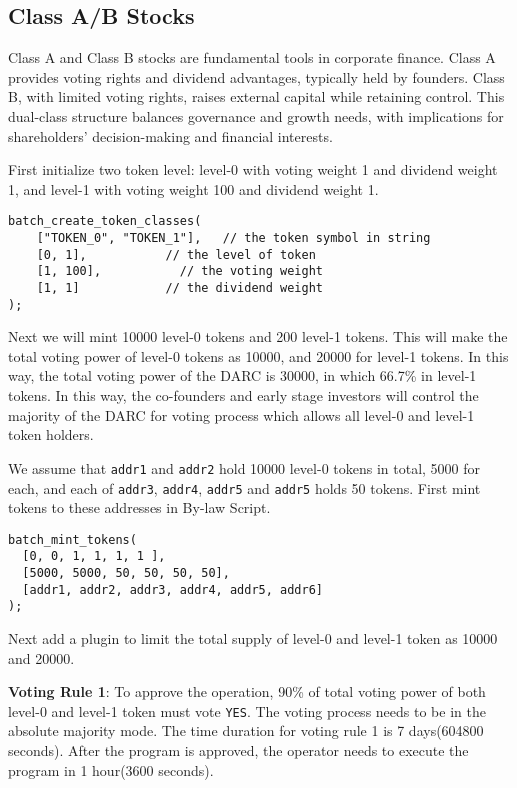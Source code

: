 \documentclass[main.tex]{subfiles}
\begin{document}
\subsection{Class A/B Stocks}

Class A and Class B stocks are fundamental tools in corporate finance. Class A provides voting rights and dividend advantages, typically held by founders. Class B, with limited voting rights, raises external capital while retaining control. This dual-class structure balances governance and growth needs, with implications for shareholders' decision-making and financial interests.

First initialize two token level: level-0 with voting weight 1 and dividend weight 1, and level-1 with voting weight 100 and dividend weight 1.

\begin{verbatim}
batch_create_token_classes(
    ["TOKEN_0", "TOKEN_1"],   // the token symbol in string
    [0, 1],           // the level of token
    [1, 100],           // the voting weight
    [1, 1]            // the dividend weight
);
\end{verbatim}

Next we will mint 10000 level-0 tokens and 200 level-1 tokens. This will make the total voting power of level-0 tokens as 10000, and 20000 for level-1 tokens. In this way, the total voting power of the DARC is 30000, in which 66.7\% in level-1 tokens. In this way, the co-founders and early stage investors will control the majority of the DARC for voting process which allows all level-0 and level-1 token holders.

We assume that \texttt{addr1} and \texttt{addr2} hold 10000 level-0 tokens in total, 5000 for each, and each of \texttt{addr3}, \texttt{addr4}, \texttt{addr5} and \texttt{addr5} holds 50 tokens. First mint tokens to these addresses in By-law Script.

\begin{verbatim}
batch_mint_tokens(
  [0, 0, 1, 1, 1, 1 ], 
  [5000, 5000, 50, 50, 50, 50], 
  [addr1, addr2, addr3, addr4, addr5, addr6]
);
\end{verbatim}

Next add a plugin to limit the total supply of level-0 and level-1 token as 10000 and 20000. 

\textbf{Voting Rule 1}: To approve the operation, 90\% of total voting power of both level-0 and level-1 token must vote \texttt{YES}. The voting process needs to be in the absolute majority mode. The time duration for voting rule 1 is 7 days(604800 seconds). After the program is approved, the operator needs to execute the program in 1 hour(3600 seconds).
\end{document}
